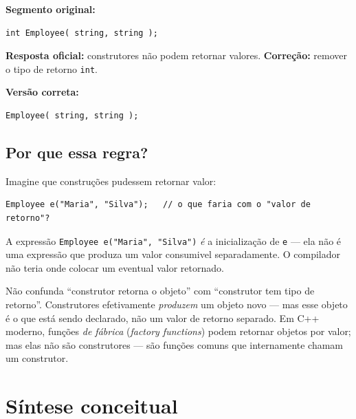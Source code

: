 \documentclass[11pt,a4paper]{article}
\begin{document}
\textbf{Segmento original:}
\begin{lstlisting}[style=cppcode,numbers=none]
int Employee( string, string );
\end{lstlisting}

\begin{resposta}
\textbf{Resposta oficial:} construtores n\~ao podem retornar valores. \textbf{Corre\c{c}\~ao:} remover o tipo de retorno \texttt{int}.
\end{resposta}

\textbf{Vers\~ao correta:}
\begin{lstlisting}[style=cppcode,numbers=none]
Employee( string, string );
\end{lstlisting}

\subsection*{Por que essa regra?}

Imagine que constru\c{c}\~oes pudessem retornar valor:

\begin{lstlisting}[style=cppcode,numbers=none]
Employee e("Maria", "Silva");   // o que faria com o "valor de retorno"?
\end{lstlisting}

\noindent A express\~ao \texttt{Employee e("Maria", "Silva")} \emph{\'e} a inicializa\c{c}\~ao de \texttt{e} --- ela n\~ao \'e uma express\~ao que produza um valor consumivel separadamente. O compilador n\~ao teria onde colocar um eventual valor retornado.

\begin{errocomum}
N\~ao confunda ``construtor retorna o objeto'' com ``construtor tem tipo de retorno''. Construtores efetivamente \emph{produzem} um objeto novo --- mas esse objeto \'e o que est\'a sendo declarado, n\~ao um valor de retorno separado. Em C++ moderno, fun\c{c}\~oes \emph{de f\'abrica} (\emph{factory functions}) podem retornar objetos por valor; mas elas n\~ao s\~ao construtores --- s\~ao fun\c{c}\~oes comuns que internamente chamam um construtor.
\end{errocomum}

\section*{S\'intese conceitual}
\end{document}
